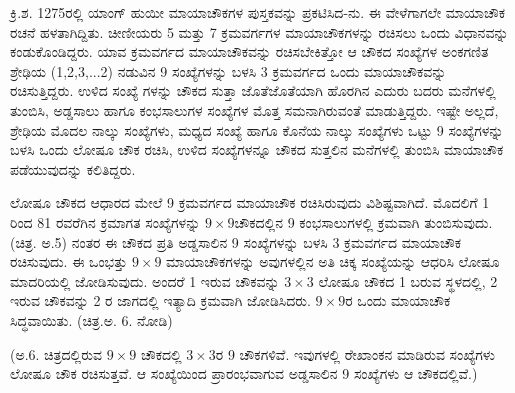 ಕ್ರಿ.ಶ. 1275ರಲ್ಲಿ ಯಾಂಗ್ ಹುಯೀ ಮಾಯಾಚೌಕಗಳ ಪುಸ್ತಕವನ್ನು ಪ್ರಕಟಿಸಿದ-ನು. ಈ ವೇಳೆಗಾಗಲೇ ಮಾಯಾಚೌಕ ರಚನೆ ಹಳತಾಗಿದ್ದಿತು. ಚೀಣೀಯರು 5 ಮತ್ತು 7 ಕ್ರಮವರ್ಗಗಳ ಮಾಯಾಚೌಕಗಳನ್ನು ರಚಿಸಲು ಒಂದು ವಿಧಾನವನ್ನು ಕಂಡುಕೊಂಡಿದ್ದರು. ಯಾವ ಕ್ರಮವರ್ಗದ ಮಾಯಾಚೌಕವನ್ನು ರಚಿಸಬೇಕಿತ್ತೋ ಆ ಚೌಕದ ಸಂಖ್ಯೆಗಳ ಅಂಕಗಣಿತ ಶ್ರೇಢಿಯ (1,2,3,...2) ನಡುವಿನ 9 ಸಂಖ್ಯೆಗಳನ್ನು ಬಳಸಿ 3 ಕ್ರಮವರ್ಗದ ಒಂದು ಮಾಯಾಚೌಕವನ್ನು ರಚಿಸುತ್ತಿದ್ದರು. ಉಳಿದ ಸಂಖ್ಯೆ ಗಳನ್ನು ಚೌಕದ ಸುತ್ತಾ ಜೊತೆಜೊತೆಯಾಗಿ ಹೊರಗಿನ ಎದುರು ಬದರು ಮನೆಗಳಲ್ಲಿ ತುಂಬಿಸಿ, ಅಡ್ಡಸಾಲು ಹಾಗೂ ಕಂಭಸಾಲುಗಳ ಸಂಖ್ಯೆಗಳ ಮೊತ್ತ ಸಮನಾಗಿರುವಂತೆ ಮಾಡುತ್ತಿದ್ದರು. ಇಷ್ಟೇ ಅಲ್ಲದೆ, ಶ್ರೇಢಿಯ ಮೊದಲ ನಾಲ್ಕು ಸಂಖ್ಯೆಗಳು, ಮಧ್ಯದ ಸಂಖ್ಯೆ ಹಾಗೂ ಕೊನೆಯ ನಾಲ್ಕು ಸಂಖ್ಯೆಗಳು ಒಟ್ಟು 9 ಸಂಖ್ಯೆಗಳನ್ನು ಬಳಸಿ ಒಂದು ಲೋಷೂ ಚೌಕ ರಚಿಸಿ, ಉಳಿದ ಸಂಖ್ಯೆಗಳನ್ನೂ ಚೌಕದ ಸುತ್ತಲಿನ ಮನೆಗಳಲ್ಲಿ ತುಂಬಿಸಿ ಮಾಯಾಚೌಕ ಪಡೆಯುವುದನ್ನು ಕಲಿತಿದ್ದರು.

ಲೋಷೂ ಚೌಕದ ಆಧಾರದ ಮೇಲೆ 9 ಕ್ರಮವರ್ಗದ ಮಾಯಾಚೌಕ ರಚಿಸಿರುವುದು ವಿಶಿಷ್ಟವಾಗಿದೆ. ಮೊದಲಿಗೆ 1 ರಿಂದ 81 ರವರೆಗಿನ ಕ್ರಮಾಗತ ಸಂಖ್ಯೆಗಳನ್ನು $9 \times 9$ಚೌಕದಲ್ಲಿನ 9 ಕಂಭಸಾಲುಗಳಲ್ಲಿ ಕ್ರಮವಾಗಿ ತುಂಬಿಸುವುದು. (ಚಿತ್ರ. ಅ.5) ನಂತರ ಈ ಚೌಕದ ಪ್ರತಿ ಅಡ್ಡಸಾಲಿನ 9 ಸಂಖ್ಯೆಗಳನ್ನು ಬಳಸಿ 3 ಕ್ರಮವರ್ಗದ ಮಾಯಾಚೌಕ ರಚಿಸುವುದು. ಈ ಒಂಭತ್ತು $9 \times 9$ ಮಾಯಾಚೌಕಗಳನ್ನು ಅವುಗಳಲ್ಲಿನ ಅತಿ ಚಿಕ್ಕ ಸಂಖ್ಯೆಯನ್ನು ಆಧರಿಸಿ ಲೋಷೂ ಮಾದರಿಯಲ್ಲಿ ಜೋಡಿಸುವುದು. ಅಂದರೆ 1 ಇರುವ ಚೌಕವನ್ನು $3 \times 3$ ಲೋಷೂ ಚೌಕದ 1 ಬರುವ ಸ್ಥಳದಲ್ಲಿ, 2 ಇರುವ ಚೌಕವನ್ನು 2 ರ ಜಾಗದಲ್ಲಿ ಇತ್ಯಾದಿ ಕ್ರಮವಾಗಿ ಜೋಡಿಸಿದರು. $9 \times 9$ರ ಒಂದು ಮಾಯಾಚೌಕ ಸಿದ್ಧವಾಯಿತು. (ಚಿತ್ರ.ಅ. 6. ನೋಡಿ)

(ಅ.6. ಚಿತ್ರದಲ್ಲಿರುವ $9 \times 9$ ಚೌಕದಲ್ಲಿ $3 \times 3$ರ 9 ಚೌಕಗಳಿವೆ. ಇವುಗಳಲ್ಲಿ ರೇಖಾಂಕನ ಮಾಡಿರುವ ಸಂಖ್ಯೆಗಳು ಲೋಷೂ ಚೌಕ ರಚಿಸುತ್ತವೆ. ಆ ಸಂಖ್ಯೆಯಿಂದ ಪ್ರಾರಂಭವಾಗುವ ಅಡ್ಡಸಾಲಿನ 9 ಸಂಖ್ಯೆಗಳು ಆ ಚೌಕದಲ್ಲಿವೆ.)

